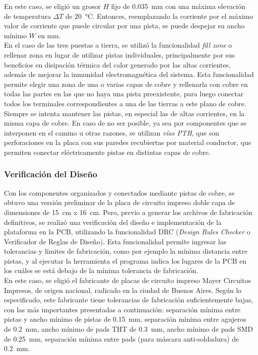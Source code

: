 En este caso, se eligió un grosor $H$ fijo de \SI[]{0.035}[]{\milli\metre} con una máxima elevación de temperatura $\Delta T$ de \SI[]{20}[]{\celsius}. Entonces, reemplazando la corriente por el máximo valor de corriente que puede circular por una pista, se puede despejar su ancho mínimo $W$ en \unit{\milli\metre}.\\

En el caso de las tres puestas a tierra, se utilizó la funcionalidad \textit{fill zone} o rellenar zona en lugar de utilizar pistas individuales, principalmente por sus beneficios en disipación térmica del calor generado por las altas corrientes, además de mejorar la inmunidad electromagnética del sistema. Esta funcionalidad permite elegir una zona de una o varias capas de cobre y rellenarla con cobre en todas las partes en las que no haya una pista preexistente, para luego conectar todos los terminales correspondientes a una de las tierras a este plano de cobre.\\

Siempre se intenta mantener las pistas, en especial las de altas corrientes, en la misma capa de cobre. En caso de no ser posible, ya sea por componentes que se interponen en el camino u otras razones, se utilizan \textit{vías PTH}, que son perforaciones en la placa con sus paredes recubiertas por material conductor, que permiten conectar eléctricamente pistas en distintas capas de cobre.\\

\subsubsection{Verificación del Diseño}
 
Con los componentes organizados y conectados mediante pistas de cobre, se obtuvo una versión preliminar de la placa de circuito impreso doble capa de dimensiones de \SI[]{15}[]{\centi\metre} x \SI[]{16}[]{\centi\metre}. Pero, previo a generar los archivos de fabricación definitivos, se realizó una verificación del diseño e implementación de la plataforma en la PCB, utilizando la funcionalidad DRC (\textit{Design Rules Checker} o Verificador de Reglas de Diseño). Esta funcionalidad permite ingresar las tolerancias y límites de fabricación, como por ejemplo la mínima distancia entre pistas, y al ejecutar la herramienta el programa indica los lugares de la PCB en los cuáles se está debajo de la mínima tolerancia de fabricación.\\

En este caso, se eligió el fabricante de placas de circuito impreso Mayer Circuitos Impresos, de origen nacional, radicado en la ciudad de Buenos Aires. Según lo especificado, este fabricante tiene tolerancias de fabricación suficientemente bajas, con las más importantes presentadas a continuación: separación mínima entre pistas y ancho mínimo de pistas de \SI[]{0.15}[]{\milli\metre}, separación mínima entre agujeros de \SI[]{0.2}[]{\milli\metre}, ancho mínimo de pads THT de \SI[]{0.3}[]{\milli\metre}, ancho mínimo de pads SMD de \SI[]{0.25}[]{\milli\metre}, separación mínima entre pads (para máscara anti-soldadura) de \SI[]{0.2}[]{\milli\metre}.\\

